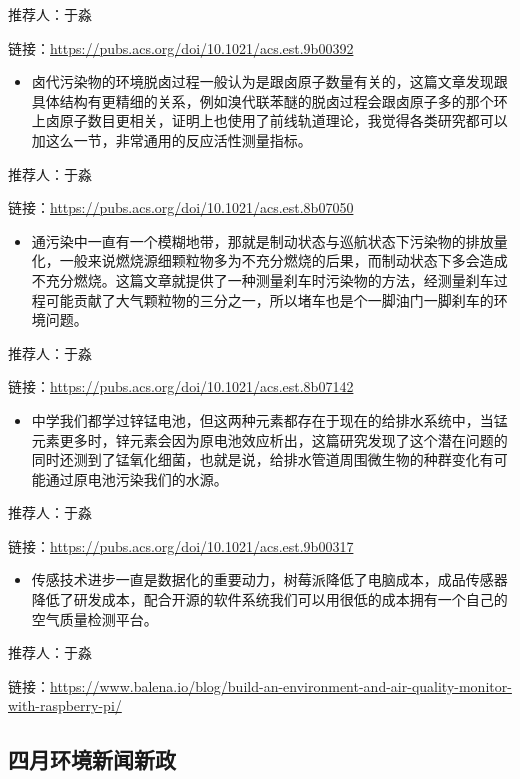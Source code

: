 \documentclass[
]{book}
\providecommand{\tightlist}{%
  \setlength{\itemsep}{0pt}\setlength{\parskip}{0pt}}
\begin{document}
推荐人：于淼

链接：\url{https://pubs.acs.org/doi/10.1021/acs.est.9b00392}

\begin{itemize}
\tightlist
\item
  卤代污染物的环境脱卤过程一般认为是跟卤原子数量有关的，这篇文章发现跟具体结构有更精细的关系，例如溴代联苯醚的脱卤过程会跟卤原子多的那个环上卤原子数目更相关，证明上也使用了前线轨道理论，我觉得各类研究都可以加这么一节，非常通用的反应活性测量指标。
\end{itemize}

推荐人：于淼

链接：\url{https://pubs.acs.org/doi/10.1021/acs.est.8b07050}

\begin{itemize}
\tightlist
\item
  通污染中一直有一个模糊地带，那就是制动状态与巡航状态下污染物的排放量化，一般来说燃烧源细颗粒物多为不充分燃烧的后果，而制动状态下多会造成不充分燃烧。这篇文章就提供了一种测量刹车时污染物的方法，经测量刹车过程可能贡献了大气颗粒物的三分之一，所以堵车也是个一脚油门一脚刹车的环境问题。
\end{itemize}

推荐人：于淼

链接：\url{https://pubs.acs.org/doi/10.1021/acs.est.8b07142}

\begin{itemize}
\tightlist
\item
  中学我们都学过锌锰电池，但这两种元素都存在于现在的给排水系统中，当锰元素更多时，锌元素会因为原电池效应析出，这篇研究发现了这个潜在问题的同时还测到了锰氧化细菌，也就是说，给排水管道周围微生物的种群变化有可能通过原电池污染我们的水源。
\end{itemize}

推荐人：于淼

链接：\url{https://pubs.acs.org/doi/10.1021/acs.est.9b00317}

\begin{itemize}
\tightlist
\item
  传感技术进步一直是数据化的重要动力，树莓派降低了电脑成本，成品传感器降低了研发成本，配合开源的软件系统我们可以用很低的成本拥有一个自己的空气质量检测平台。
\end{itemize}

推荐人：于淼

链接：\url{https://www.balena.io/blog/build-an-environment-and-air-quality-monitor-with-raspberry-pi/}

\hypertarget{ux56dbux6708ux73afux5883ux65b0ux95fbux65b0ux653f}{%
\subsection*{四月环境新闻新政}\label{ux56dbux6708ux73afux5883ux65b0ux95fbux65b0ux653f}}
\end{document}

